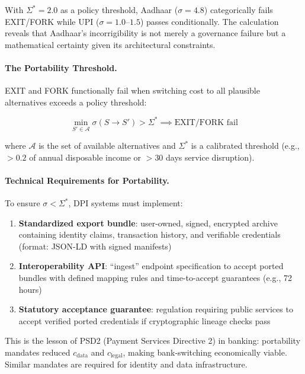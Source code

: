 With $\Sigma^* = 2.0$ as a policy threshold, Aadhaar ($\sigma = 4.8$) categorically fails EXIT/FORK while UPI ($\sigma = 1.0$--$1.5$) passes conditionally. The calculation reveals that Aadhaar's incorrigibility is not merely a governance failure but a mathematical certainty given its architectural constraints.

\paragraph{The Portability Threshold.} EXIT and FORK functionally fail when switching cost to all plausible alternatives exceeds a policy threshold:

\begin{equation}
\min_{S' \in \mathcal{A}} \sigma(S \to S') > \Sigma^* \implies \text{EXIT/FORK fail}
\label{eq:portability-threshold}
\end{equation}

where $\mathcal{A}$ is the set of available alternatives and $\Sigma^*$ is a calibrated threshold (e.g., $>0.2$ of annual disposable income or $>30$ days service disruption).

\paragraph{Technical Requirements for Portability.} To ensure $\sigma < \Sigma^*$, DPI systems must implement:
\begin{enumerate}[noitemsep]
    \item \textbf{Standardized export bundle}: user-owned, signed, encrypted archive containing identity claims, transaction history, and verifiable credentials (format: JSON-LD with signed manifests)
    \item \textbf{Interoperability API}: ``ingest'' endpoint specification to accept ported bundles with defined mapping rules and time-to-accept guarantees (e.g., 72 hours)
    \item \textbf{Statutory acceptance guarantee}: regulation requiring public services to accept verified ported credentials if cryptographic lineage checks pass
\end{enumerate}

This is the lesson of PSD2 (Payment Services Directive 2) in banking: portability mandates reduced $c_{\text{data}}$ and $c_{\text{legal}}$, making bank-switching economically viable. Similar mandates are required for identity and data infrastructure.


